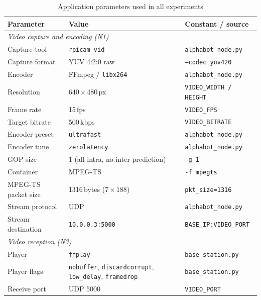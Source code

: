 \begin{table}[h]
\centering
\caption{Application parameters used in all experiments}
\label{tab:app-params}
\begin{tabular}{lll}
\toprule
\textbf{Parameter} & \textbf{Value} & \textbf{Constant / source} \\
\midrule
\multicolumn{3}{l}{\textit{Video capture and encoding (N1)}} \\
Capture tool        & \texttt{rpicam-vid}              & \texttt{alphabot\_node.py} \\
Capture format      & YUV 4:2:0 raw                    & \texttt{--codec yuv420} \\
Encoder             & FFmpeg / \texttt{libx264}         & \texttt{alphabot\_node.py} \\
Resolution          & $640 \times 480$\,px              & \texttt{VIDEO\_WIDTH / HEIGHT} \\
Frame rate          & 15\,fps                           & \texttt{VIDEO\_FPS} \\
Target bitrate      & 500\,kbps                         & \texttt{VIDEO\_BITRATE} \\
Encoder preset      & \texttt{ultrafast}                & \texttt{alphabot\_node.py} \\
Encoder tune        & \texttt{zerolatency}              & \texttt{alphabot\_node.py} \\
GOP size            & 1 (all-intra, no inter-prediction) & \texttt{-g 1} \\
Container           & MPEG-TS                           & \texttt{-f mpegts} \\
MPEG-TS packet size & 1316\,bytes ($7 \times 188$)      & \texttt{pkt\_size=1316} \\
Stream protocol     & UDP                               & \texttt{alphabot\_node.py} \\
Stream destination  & \texttt{10.0.0.3:5000}           & \texttt{BASE\_IP:VIDEO\_PORT} \\
\midrule
\multicolumn{3}{l}{\textit{Video reception (N3)}} \\
Player              & \texttt{ffplay}                   & \texttt{base\_station.py} \\
Player flags        & \texttt{nobuffer}, \texttt{discardcorrupt}, \texttt{low\_delay}, \texttt{framedrop} & \texttt{base\_station.py} \\
Receive port        & UDP 5000                          & \texttt{VIDEO\_PORT} \\
\midrule

\end{tabular}
\end{table}
